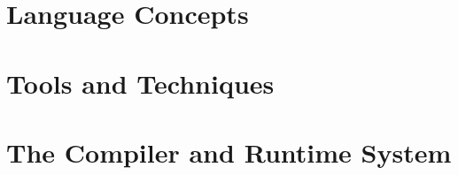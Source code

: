 
\newpage
\part{Language Concepts}

\newpage

\newpage

\newpage

\newpage

\newpage

\newpage

\newpage

\newpage

\newpage

\newpage

\newpage

\newpage
\part{Tools and Techniques}

\newpage

\newpage

\newpage

\newpage

\newpage

\newpage
\part{The Compiler and Runtime System}

\newpage

\newpage

\newpage

\newpage

\newpage

\newpage